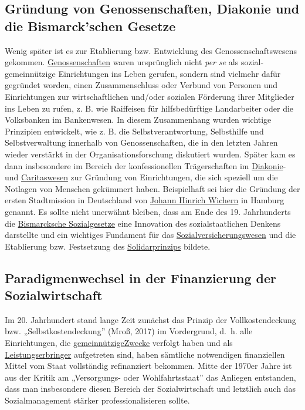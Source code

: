 \documentclass[
  letterpaper,
]{book}
\begin{document}
\subsection{Gründung von Genossenschaften, Diakonie und die
Bismarck'schen Gesetze}\label{gruendung}

Wenig später ist es zur Etablierung bzw. Entwicklung des
Genossenschaftswesens gekommen.
\href{https://de.wikipedia.org/wiki/Genossenschaft}{Genossenschaften}
waren ursprünglich nicht \emph{per se} als sozial-gemeinnützige
Einrichtungen ins Leben gerufen, sondern sind vielmehr dafür gegründet
worden, einen Zusammenschluss oder Verbund von Personen und
Einrichtungen zur wirtschaftlichen und/oder sozialen Förderung ihrer
Mitglieder ins Leben zu rufen, z. B. wie Raiffeisen für hilfsbedürftige
Landarbeiter oder die Volksbanken im Bankenwesen. In diesem Zusammenhang
wurden wichtige Prinzipien entwickelt, wie z. B. die
Selbstverantwortung, Selbsthilfe und Selbstverwaltung innerhalb von
Genossenschaften, die in den letzten Jahren wieder verstärkt in der
Organisationsforschung diskutiert wurden. Später kam es dann
insbesondere im Bereich der konfessionellen Trägerschaften im
\href{https://www.diakonie.de/}{Diakonie}- und
\href{https://www.caritas.de/}{Caritaswesen} zur Gründung von
Einrichtungen, die sich speziell um die Notlagen von Menschen gekümmert
haben. Beispielhaft sei hier die Gründung der ersten Stadtmission in
Deutschland von
\href{https://de.wikipedia.org/wiki/Johann_Hinrich_Wichern}{Johann
Hinrich Wichern} in Hamburg genannt. Es sollte nicht unerwähnt bleiben,
dass am Ende des 19. Jahrhunderts die
\href{https://www.bpb.de/themen/soziale-lage/rentenpolitik/289619/bismarcks-sozialgesetze/}{Bismarcksche
Sozialgesetze} eine Innovation des sozialstaatlichen Denkens darstellte
und ein wichtiges Fundament für das
\href{https://de.wikipedia.org/wiki/Sozialversicherung}{Sozialversicherungswesen}
und die Etablierung bzw. Festsetzung des
\href{https://www.bpb.de/themen/gesundheit/gesundheitspolitik/252319/das-solidarprinzip/}{Solidarprinzips}
bildete.

\subsection{Paradigmenwechsel in der Finanzierung der
Sozialwirtschaft}\label{paradigmenwechsel}

Im 20. Jahrhundert stand lange Zeit zunächst das Prinzip der
Vollkostendeckung bzw. „Selbstkostendeckung'' (Mroß, 2017) im
Vordergrund, d.~h. alle Einrichtungen, die
\href{https://www.gesetze-im-internet.de/ao_1977/__52.html\#:~:text=(1)\%20Eine\%20K\%C3\%B6rperschaft\%20verfolgt\%20gemeinn\%C3\%BCtzige,sittlichem\%20Gebiet\%20selbstlos\%20zu\%20f\%C3\%B6rdern.}{gemeinnützigeZwecke}
verfolgt haben und als
\href{https://de.wikipedia.org/wiki/Leistungserbringer}{Leistungserbringer}
aufgetreten sind, haben sämtliche notwendigen finanziellen Mittel vom
Staat vollständig refinanziert bekommen. Mitte der 1970er Jahre ist aus
der Kritik am „Versorgungs- oder Wohlfahrtsstaat'' das Anliegen
entstanden, dass man insbesondere diesen Bereich der Sozialwirtschaft
und letztlich auch das Sozialmanagement stärker professionalisieren
sollte.
\end{document}
